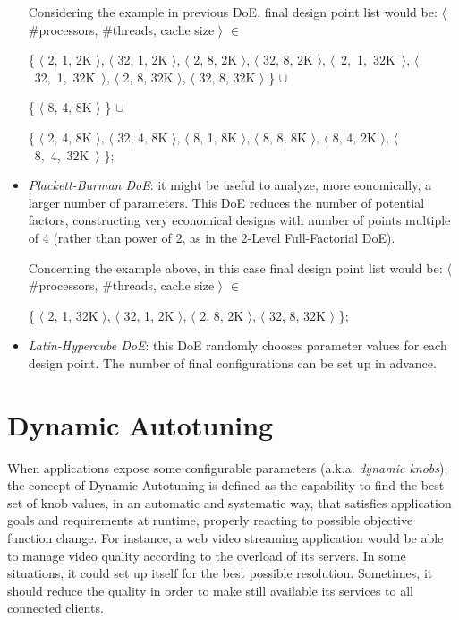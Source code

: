 \begin{itemize}
\begin{enumerate}
    \end{enumerate}
    
    Considering the example in previous DoE, final design point list would be: $\langle$ \#processors, \#threads, cache size $\rangle$ $\in$
    
    \{ $\langle$ 2, 1, 2K $\rangle$, $\langle$ 32, 1, 2K $\rangle$, $\langle$ 2, 8, 2K $\rangle$, $\langle$ 32, 8, 2K $\rangle$, \hbox{$\langle$ 2, 1, 32K $\rangle$}, \hbox{$\langle$ 32, 1, 32K $\rangle$}, $\langle$ 2, 8, 32K $\rangle$, $\langle$ 32, 8, 32K $\rangle$ \} $\cup$ 
    
    \{ $\langle$ 8, 4, 8K $\rangle$ \} $\cup$
    
    \{ $\langle$ 2, 4, 8K $\rangle$, $\langle$ 32, 4, 8K $\rangle$, $\langle$ 8, 1, 8K $\rangle$, $\langle$ 8, 8, 8K $\rangle$, $\langle$ 8, 4, 2K $\rangle$, \hbox{$\langle$ 8, 4, 32K $\rangle$} \};
    
    \item \textit{Plackett-Burman DoE}: it might be useful to analyze, more eonomically, a larger number of parameters. This DoE reduces the number of potential factors, constructing very economical designs with number of points multiple of 4 (rather than power of 2, as in the 2-Level Full-Factorial DoE).
    
    Concerning the example above, in this case final design point list would be: $\langle$ \#processors, \#threads, cache size $\rangle$ $\in$
    
    \{ $\langle$ 2, 1, 32K $\rangle$, $\langle$ 32, 1, 2K $\rangle$, $\langle$ 2, 8, 2K $\rangle$, $\langle$ 32, 8, 32K $\rangle$ \};
    
    \item \textit{Latin-Hypercube DoE}: this DoE randomly chooses parameter values for each design point. The number of final configurations can be set up in advance.

\end{itemize}





\section{Dynamic Autotuning}

When applications expose some configurable parameters (a.k.a. \textit{dynamic knobs}), the concept of Dynamic Autotuning is defined as the capability to find the best set of knob values, in an automatic and systematic way, that satisfies application goals and requirements at runtime, properly reacting to possible objective function change. For instance, a web video streaming application would be able to manage video quality according to the overload of its servers. In some situations, it could set up itself for the best possible resolution. Sometimes, it should reduce the quality in order to make still available its services to all connected clients.

